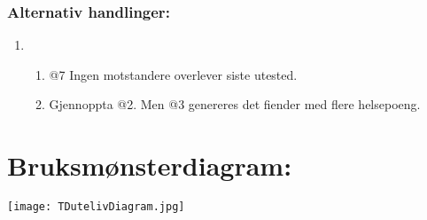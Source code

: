 \documentclass[12pt]{report}
\begin{document}
\subsubsection*{Alternativ handlinger:}
\begin{enumerate}[label=\Alph*]
\item 
\bigskip
\begin{enumerate}
\item @7 Ingen motstandere overlever siste utested.
\item Gjennoppta @2. Men @3 genereres det fiender med flere helsepoeng.  
\end{enumerate}
\end{enumerate}
\section*{Bruksm{\o}nsterdiagram:}
\vspace{1cm}
\texttt{[image: TDutelivDiagram.jpg]}
\end{document}

